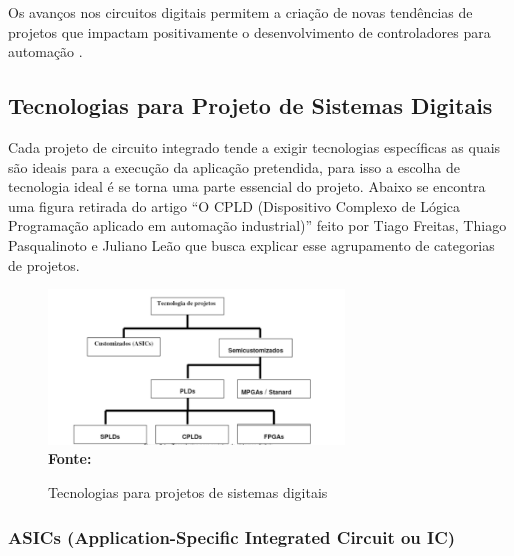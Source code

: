 \begin{citacaodireta}
Os avanços nos circuitos digitais permitem a criação de novas tendências de projetos que impactam positivamente o desenvolvimento de controladores para automação 
\cite[25]{Oliveira2011}.
\end{citacaodireta}


\subsection{\esp Tecnologias para Projeto de Sistemas Digitais}

Cada projeto de circuito integrado tende a exigir tecnologias específicas as quais são ideais para a execução da aplicação pretendida, para isso a escolha de tecnologia ideal é se torna uma parte essencial do projeto. Abaixo se encontra uma figura retirada do artigo “O CPLD (Dispositivo Complexo de Lógica Programação aplicado em automação industrial)” feito por Tiago Freitas, Thiago Pasqualinoto e Juliano Leão que busca explicar esse agrupamento de categorias de projetos.

\vspace{-0.2cm}
\begin{figure}[ht]
	\centering	
	\caption{Tecnologias para projetos de sistemas digitais}
	\vspace{-0.4cm}
	\includegraphics[width=0.7\textwidth]{figuras/Figura1.png}
	 \vspace{-0.2cm}
	\\\textbf{\footnotesize Fonte:  }
	\label{fig:figura1}
\end{figure}
\vspace{-0.5cm}

   \newpage
   
\subsubsection{\esp ASICs (Application-Specific Integrated Circuit ou IC)}


